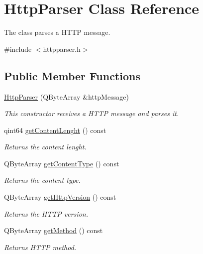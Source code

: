 \hypertarget{class_http_parser}{}\section{Http\+Parser Class Reference}
\label{class_http_parser}


The class parses a H\+T\+TP message.  




{\ttfamily \#include $<$httpparser.\+h$>$}

\subsection*{Public Member Functions}
\begin{DoxyCompactItemize}
\item 
\hyperlink{class_http_parser_a91e6c1876337b53694347476f277d1a2}{Http\+Parser} (Q\+Byte\+Array \&http\+Message)
\begin{DoxyCompactList}\small\item\em This constructor receives a H\+T\+TP message and parses it. \end{DoxyCompactList}\item 
qint64 \hyperlink{class_http_parser_ad42f6a0ff6ab987ccf526ac995af196f}{get\+Content\+Lenght} () const
\begin{DoxyCompactList}\small\item\em Returns the content lenght. \end{DoxyCompactList}\item 
Q\+Byte\+Array \hyperlink{class_http_parser_a3adf500c4b0cf85d8249e071a7094f20}{get\+Content\+Type} () const
\begin{DoxyCompactList}\small\item\em Returns the content type. \end{DoxyCompactList}\item 
Q\+Byte\+Array \hyperlink{class_http_parser_a760eb9ec81fa1983b8eb5b088b0e6f41}{get\+Http\+Version} () const
\begin{DoxyCompactList}\small\item\em Returns the H\+T\+TP version. \end{DoxyCompactList}\item 
Q\+Byte\+Array \hyperlink{class_http_parser_a283aa2b313491a592babdb5528086f71}{get\+Method} () const
\begin{DoxyCompactList}\small\item\em Returns H\+T\+TP method. \end{DoxyCompactList}\item 

\end{DoxyCompactItemize}
